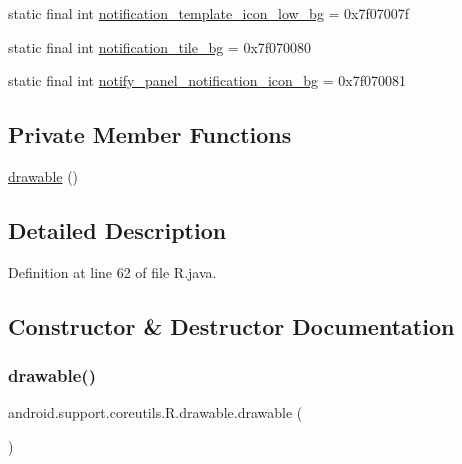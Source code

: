 \begin{DoxyCompactItemize}
\item 
static final int \mbox{\hyperlink{classandroid_1_1support_1_1coreutils_1_1_r_1_1drawable_a403b56ac85ecd42e8800e902613bf438}{notification\+\_\+template\+\_\+icon\+\_\+low\+\_\+bg}} = 0x7f07007f
\item 
static final int \mbox{\hyperlink{classandroid_1_1support_1_1coreutils_1_1_r_1_1drawable_a6108983b4bcd3db6cd2fd8814a20d1b9}{notification\+\_\+tile\+\_\+bg}} = 0x7f070080
\item 
static final int \mbox{\hyperlink{classandroid_1_1support_1_1coreutils_1_1_r_1_1drawable_a052e2e692f5581a2fcda2ae98607764b}{notify\+\_\+panel\+\_\+notification\+\_\+icon\+\_\+bg}} = 0x7f070081
\end{DoxyCompactItemize}
\subsection*{Private Member Functions}
\begin{DoxyCompactItemize}
\item 
\mbox{\hyperlink{classandroid_1_1support_1_1coreutils_1_1_r_1_1drawable_a6debf1c993319a575ec3ecf3f114afab}{drawable}} ()
\end{DoxyCompactItemize}


\subsection{Detailed Description}


Definition at line 62 of file R.\+java.



\subsection{Constructor \& Destructor Documentation}
\mbox{\label{classandroid_1_1support_1_1coreutils_1_1_r_1_1drawable_a6debf1c993319a575ec3ecf3f114afab}} 
\subsubsection{\texorpdfstring{drawable()}{drawable()}}
{\footnotesize\ttfamily android.\+support.\+coreutils.\+R.\+drawable.\+drawable (\begin{DoxyParamCaption}{ }\end{DoxyParamCaption})\hspace{0.3cm}{\ttfamily [private]}}



